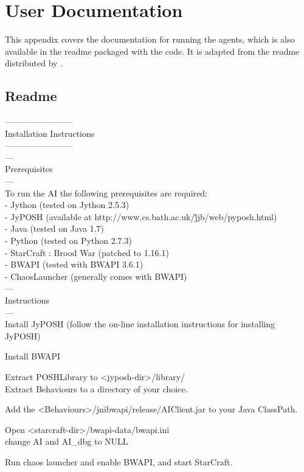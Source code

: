 \documentclass[11pt,openright,a4paper]{report}
\begin{document}


\appendix

\chapter{User Documentation}
This appendix covers the documentation for running the agents, which is also available in the readme packaged with the code. It is adapted from the readme distributed by .
\section{Readme}
------------------------\\
Installation Instructions\\
------------------------\\
	---\\
	Prerequisites\\
	---\\
	To run the AI the following prerequisites are required:\\
		- Jython (tested on Jython 2.5.3)\\
		- JyPOSH (available at http://www.cs.bath.ac.uk/\~jjb/web/pyposh.html)\\
		- Java (tested on Java 1.7)\\
		- Python (tested on Python 2.7.3)\\
		- StarCraft : Brood War (patched to 1.16.1)\\
		- BWAPI (tested with BWAPI 3.6.1)\\
		- ChaosLauncher (generally comes with BWAPI)\\
	---\\
	Instructions\\
	---\\
	Install JyPOSH (follow the on-line installation instructions for installing JyPOSH)
	
	Install BWAPI

	Extract POSHLibrary to \textless jyposh-dir\textgreater /library/\\
	Extract Behaviours to a directory of your choice.

	Add the \textless Behaviours\textgreater /jnibwapi/release/AIClient.jar to your Java ClassPath.

	Open \textless starcraft-dir\textgreater /bwapi-data/bwapi.ini\\
	change AI and AI\_dbg to NULL

	Run chaos launcher and enable BWAPI, and start StarCraft.
	
\end{document}
